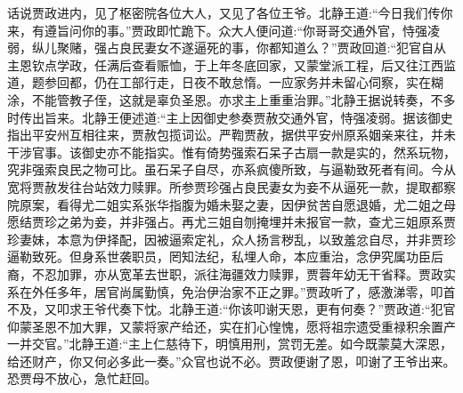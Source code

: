 


\begin{parag}
    话说贾政进内，见了枢密院各位大人，又见了各位王爷。北静王道:“今日我们传你来，有遵旨问你的事。”贾政即忙跪下。众大人便问道:“你哥哥交通外官，恃强凌弱，纵儿聚赌，强占良民妻女不遂逼死的事，你都知道么？”贾政回道:“犯官自从主恩钦点学政，任满后查看赈恤，于上年冬底回家，又蒙堂派工程，后又往江西监道，题参回都，仍在工部行走，日夜不敢怠惰。一应家务并未留心伺察，实在糊涂，不能管教子侄，这就是辜负圣恩。亦求主上重重治罪。”北静王据说转奏，不多时传出旨来。北静王便述道:“主上因御史参奏贾赦交通外官，恃强凌弱。据该御史指出平安州互相往来，贾赦包揽词讼。严鞫贾赦，据供平安州原系姻亲来往，并未干涉官事。该御史亦不能指实。惟有倚势强索石呆子古扇一款是实的，然系玩物，究非强索良民之物可比。虽石呆子自尽，亦系疯傻所致，与逼勒致死者有间。今从宽将贾赦发往台站效力赎罪。所参贾珍强占良民妻女为妾不从逼死一款，提取都察院原案，看得尤二姐实系张华指腹为婚未娶之妻，因伊贫苦自愿退婚，尤二姐之母愿结贾珍之弟为妾，并非强占。再尤三姐自刎掩埋并未报官一款，查尤三姐原系贾珍妻妹，本意为伊择配，因被逼索定礼，众人扬言秽乱，以致羞忿自尽，并非贾珍逼勒致死。但身系世袭职员，罔知法纪，私埋人命，本应重治，念伊究属功臣后裔，不忍加罪，亦从宽革去世职，派往海疆效力赎罪，贾蓉年幼无干省释。贾政实系在外任多年，居官尚属勤慎，免治伊治家不正之罪。”贾政听了，感激涕零，叩首不及，又叩求王爷代奏下忱。北静王道:“你该叩谢天恩，更有何奏？”贾政道:“犯官仰蒙圣恩不加大罪，又蒙将家产给还，实在扪心惶愧，愿将祖宗遗受重禄积余置产一并交官。”北静王道:“主上仁慈待下，明慎用刑，赏罚无差。如今既蒙莫大深恩，给还财产，你又何必多此一奏。”众官也说不必。贾政便谢了恩，叩谢了王爷出来。恐贾母不放心，急忙赶回。
\end{parag}


